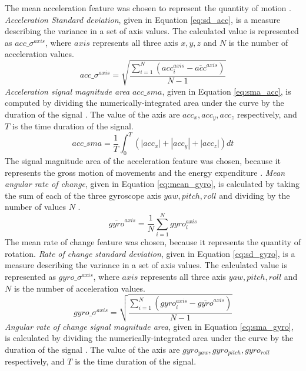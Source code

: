The mean acceleration feature was chosen to represent the quantity of motion \cite{Arif2015}.
\emph{Acceleration Standard deviation}, given in Equation \ref{eq:sd_acc}, is a measure describing the variance in a set of axis values. The calculated value is represented as $acc\_\sigma^{axis}$, where $axis$ represents all three axis $x,y,z$ and $N$ is the number of acceleration values.
\begin{equation}\label{eq:sd_acc}
acc\_\sigma^{axis} = \sqrt{\frac{\sum_{i=1}^{N}(acc^{axis}_i - \overline{acc}^{axis})}{N - 1}}
\end{equation}
\emph{Acceleration signal magnitude area} $acc\_sma$, given in Equation \ref{eq:sma_acc}, is computed by dividing the numerically-integrated area under the curve by the duration of the signal \cite{Totty2017}. The value of the axis are $acc_x,acc_y,acc_z$ respectively, and $T$ is the time duration of the signal.
\begin{equation}\label{eq:sma_acc}
acc\_sma = \frac{1}{T}\int_{0}^{T}(|acc_x|+|acc_y|+|acc_z|)dt
\end{equation}
The signal magnitude area of the acceleration feature was chosen, because it represents the gross motion of movements and the energy expenditure \cite{Jeran2016}. \emph{Mean angular rate of change}, given in Equation \ref{eq:mean_gyro}, is calculated by taking the sum of each of the three gyroscope axis $yaw, pitch, roll$ and dividing by the number of values $N$ \cite{Totty2017}.
\begin{equation}\label{eq:mean_gyro}
\overline{gyro}^{axis} = \frac{1}{N}\sum_{i=1}^{N}gyro^{axis}_i
\end{equation}
The mean rate of change feature was chosen, because it represents the quantity of rotation.
\emph{Rate of change standard deviation}, given in Equation \ref{eq:sd_gyro}, is a measure describing the variance in a set of axis values. The calculated value is represented as $gyro\_\sigma^{axis}$, where $axis$ represents all three axis $yaw,pitch,roll$ and $N$ is the number of acceleration values.
\begin{equation}\label{eq:sd_gyro}
gyro\_\sigma^{axis} = \sqrt{\frac{\sum_{i=1}^{N}(gyro^{axis}_i - \overline{gyro}^{axis})}{N - 1}}
\end{equation}
\emph{Angular rate of change signal magnitude area}, given in Equation \ref{eq:sma_gyro}, is calculated by dividing the numerically-integrated area under the curve by the duration of the signal \cite{Totty2017}. The value of the axis are $gyro_{yaw},gyro_{pitch},gyro_{roll}$ respectively, and $T$ is the time duration of the signal.
